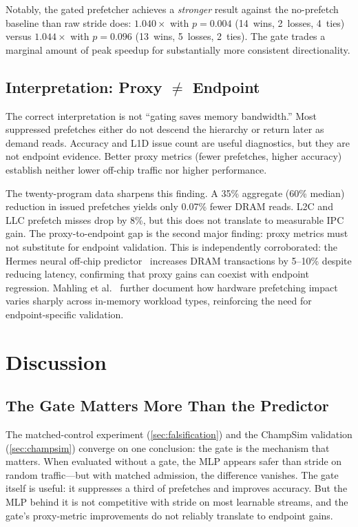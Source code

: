 \documentclass[conference]{IEEEtran}
\begin{document}
Notably, the gated prefetcher achieves a \emph{stronger} result against the
no-prefetch baseline than raw stride does: $1.040\times$ with $p = 0.004$
(14~wins, 2~losses, 4~ties) versus $1.044\times$ with $p = 0.096$
(13~wins, 5~losses, 2~ties). The gate trades a marginal amount of peak
speedup for substantially more consistent directionality.

\subsection{\texorpdfstring{Interpretation: Proxy $\neq$ Endpoint}{Interpretation: Proxy ≠ Endpoint}}

The correct interpretation is not ``gating saves memory bandwidth.'' Most
suppressed prefetches either do not descend the hierarchy or return later as
demand reads. Accuracy and L1D issue count are useful diagnostics, but they
are not endpoint evidence. Better proxy metrics (fewer prefetches, higher
accuracy) establish neither lower off-chip traffic nor higher performance.

The twenty-program data sharpens this finding. A 35\% aggregate (60\%
median) reduction in issued prefetches yields only 0.07\% fewer DRAM reads.
L2C and LLC prefetch misses drop by 8\%, but this does not translate to
measurable IPC gain. The proxy-to-endpoint gap is the second major finding:
proxy metrics must not substitute for endpoint validation.
This is independently corroborated: the Hermes neural off-chip
predictor~\cite{hermes} increases DRAM transactions by 5--10\% despite
reducing latency, confirming that proxy gains can coexist with endpoint
regression. Mahling et al.~\cite{mahling2025} further document how
hardware prefetching impact varies sharply across in-memory workload
types, reinforcing the need for endpoint-specific validation.

\section{Discussion}
\label{sec:discussion}

\subsection{The Gate Matters More Than the Predictor}

The matched-control experiment (\cref{sec:falsification}) and the ChampSim
validation (\cref{sec:champsim}) converge on one conclusion: the gate is
the mechanism that matters. When evaluated without a gate, the MLP appears
safer than stride on random traffic---but with matched admission, the
difference vanishes. The gate itself is useful: it suppresses a third of
prefetches and improves accuracy. But the MLP behind it is not competitive
with stride on most learnable streams, and the gate's proxy-metric
improvements do not reliably translate to endpoint gains.
\end{document}
